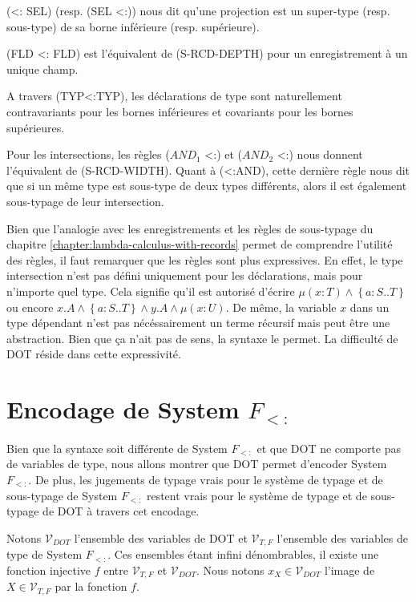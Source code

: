 (<: SEL) (resp. (SEL <:)) nous dit qu'une projection est un super-type (resp.
sous-type) de sa borne inférieure (resp. supérieure).

(FLD <: FLD) est l'équivalent de (S-RCD-DEPTH) pour un enregistrement à un
unique champ.

A travers (TYP<:TYP), les déclarations de type sont naturellement contravariants
pour les bornes inférieures et covariants pour les bornes supérieures.

Pour les intersections, les règles ($AND_{1}$ <:) et ($AND_{2}$ <:) nous donnent
l'équivalent de (S-RCD-WIDTH). Quant à (<:AND), cette dernière règle nous dit
que si un même type est sous-type de deux types différents, alors il est
également sous-typage de leur intersection.

Bien que l'analogie avec les enregistrements et les règles de sous-typage du
chapitre \ref{chapter:lambda-calculus-with-records} permet de comprendre
l'utilité des règles, il faut remarquer que les règles sont plus expressives. En
effet, le type intersection n'est pas défini uniquement pour les déclarations,
mais pour n'importe quel type. Cela signifie qu'il est autorisé d'écrire $\mu(x
: T) \wedge \left\{ a : S .. T \right\}$ ou encore $x.A \wedge \left\{ a : S ..
  T \right\} \wedge y.A \wedge \mu(x : U)$.
De même, la variable $x$ dans un type dépendant n'est pas nécéssairement un
terme récursif mais peut être une abstraction. Bien que ça n'ait pas de sens, la
syntaxe le permet.
La difficulté de DOT réside dans cette expressivité.

\section{Encodage de System $F_{<:}$}

Bien que la syntaxe soit différente de System $F_{<:}$ et que DOT ne comporte
pas de variables de type, nous allons montrer que DOT permet d'encoder System
$F_{<:}$. De plus, les jugements de typage vrais pour le système de typage et de
sous-typage de System $F_{<:}$ restent vrais pour le système de typage et de
sous-typage de DOT à travers cet encodage.

Notons $\mathcal{V}_{DOT}$ l'ensemble des variables de DOT et $\mathcal{V}_{T,
  F}$ l'ensemble des variables de type de System $F_{<:}$. Ces ensembles 
étant infini dénombrables, il existe une fonction injective $f$ entre
$\mathcal{V}_{T, F}$ et $\mathcal{V}_{DOT}$. Nous notons $x_{X} \in
\mathcal{V}_{DOT}$ l'image de $X \in \mathcal{V}_{T, F}$ par la fonction $f$.

